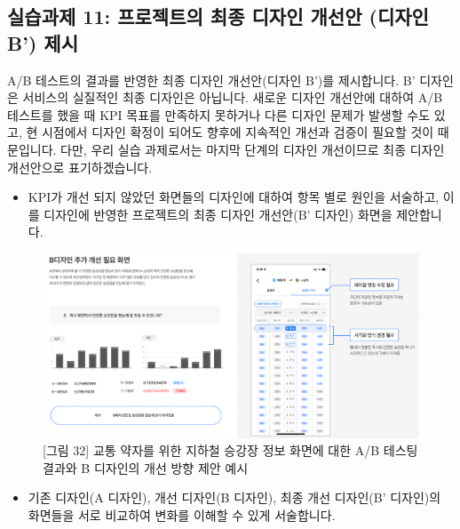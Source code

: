 \documentclass[
  letterpaper,
]{book}
\providecommand{\tightlist}{%
  \setlength{\itemsep}{0pt}\setlength{\parskip}{0pt}}\usepackage{longtable,booktabs,array}
\begin{document}
\subsection{실습과제 11: 프로젝트의 최종 디자인 개선안 (디자인 B')
제시}\label{uxc2e4uxc2b5uxacfcuxc81c-11-uxd504uxb85cuxc81duxd2b8uxc758-uxcd5cuxc885-uxb514uxc790uxc778-uxac1cuxc120uxc548-uxb514uxc790uxc778-b-uxc81cuxc2dc}

A/B 테스트의 결과를 반영한 최종 디자인 개선안(디자인 B')를 제시합니다.
B' 디자인은 서비스의 실질적인 최종 디자인은 아닙니다. 새로운 디자인
개선안에 대하여 A/B 테스트를 했을 때 KPI 목표를 만족하지 못하거나 다른
디자인 문제가 발생할 수도 있고, 현 시점에서 디자인 확정이 되어도 향후에
지속적인 개선과 검증이 필요할 것이 때문입니다. 다만, 우리 실습
과제로서는 마지막 단계의 디자인 개선이므로 최종 디자인 개선안으로
표기하겠습니다.

\begin{itemize}
\tightlist
\item
  KPI가 개선 되지 않았던 화면들의 디자인에 대하여 항목 별로 원인을
  서술하고, 이를 디자인에 반영한 프로젝트의 최종 디자인 개선안(B'
  디자인) 화면을 제안합니다.
\end{itemize}

\begin{figure}[H]

{\centering \includegraphics{img/fig32.png}

}

\caption{{[}그림 32{]} 교통 약자를 위한 지하철 승강장 정보 화면에 대한
A/B 테스팅 결과와 B 디자인의 개선 방향 제안 예시}

\end{figure}%

\begin{itemize}
\tightlist
\item
  기존 디자인(A 디자인), 개선 디자인(B 디자인), 최종 개선 디자인(B'
  디자인)의 화면들을 서로 비교하여 변화를 이해할 수 있게 서술합니다.
\end{itemize}
\end{document}
